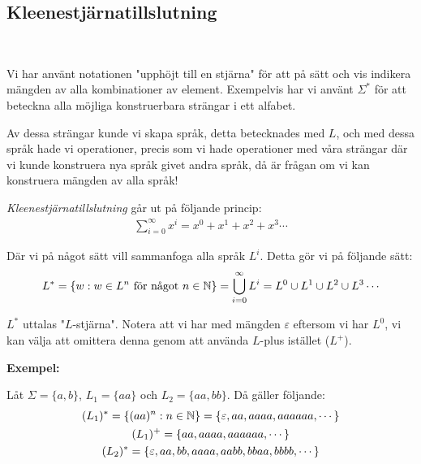 \subsection{Kleenestjärnatillslutning}\hfill\\\par
\noindent Vi har använt notationen "upphöjt till en stjärna" för att på sätt och vis indikera mängden av alla kombinationer av element. Exempelvis har vi använt $\Sigma^*$ för att beteckna alla möjliga konstruerbara strängar i ett alfabet.\par
\noindent Av dessa strängar kunde vi skapa språk, detta betecknades med $L$, och med dessa språk hade vi operationer, precis som vi hade operationer med våra strängar där vi kunde konstruera nya språk givet andra språk, då är frågan om vi kan konstruera mängden av alla språk!
\par\bigskip
\noindent \textit{Kleenestjärnatillslutning} går ut på följande princip:
\begin{equation*}
  \begin{gathered}
    \sum_{i=0}^{\infty}x^i = x^0+x^1+x^2+x^3\cdots
  \end{gathered}
\end{equation*}
\par\bigskip
\noindent Där vi på något sätt vill sammanfoga alla språk $L^i$. Detta gör vi på följande sätt:
\begin{equation*}
  \begin{gathered}
    L^* = \{w:w\in L^n \text{ för något } n\in\mathbb{N}\} = \bigcup_{i=0}^{\infty}L^i = L^0\cup L^1\cup L^2\cup L^3\cdots
  \end{gathered}
\end{equation*}
\par\bigskip
\noindent $L^*$ uttalas "$L$-stjärna". Notera att vi har med mängden $\varepsilon$ eftersom vi har $L^0$, vi kan välja att omittera denna genom att använda $L$-plus istället ($L^+$).
\par\bigskip
\noindent\textbf{Exempel:}\par
\noindent Låt $\Sigma = \{a,b\}$, $L_1 = \{aa\}$ och $L_2 = \{aa,bb\}$. Då gäller följande:
\begin{equation*}
  \begin{gathered}
  (L_1)^* = \{(aa)^n:n\in\mathbb{N}\} = \{\varepsilon, aa, aaaa, aaaaaa,\cdots\}\\
  (L_1)^+ = \{aa,aaaa,aaaaaa,\cdots\}\\
  (L_2)^* = \{\varepsilon,aa,bb,aaaa,aabb,bbaa,bbbb,\cdots\}
  \end{gathered}
\end{equation*}
\newpage
